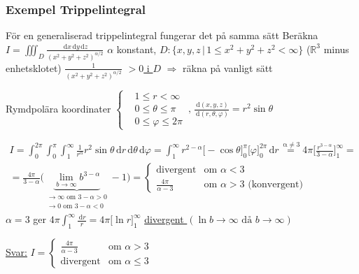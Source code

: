 \documentclass[a4paper]{article}
\newcommand{\svar}[1]{\underline{\underline{#1}}}
\newcommand{\de}[1]{\,\mathrm{d}#1}
\begin{document}
\subsubsection{Exempel Trippelintegral}
För en generaliserad trippelintegral fungerar det på samma sätt \newline
Beräkna $I=\iiint_D \frac{\de{x}\de{y}\de{z}}{(x^2+y^2+z^2)^{\alpha/2}}$ \newline
$\alpha$ konstant, $D: \{x,y,z \,|\, 1\leq x^2+y^2+z^2 <\infty\}$ ($\mathbb{R}^3$ minus enhetsklotet) \newline
$\frac{1}{(x^2+y^2+z^2)^{\alpha/2}}$ \underline{$> 0$ i $D$} $\Rightarrow$ räkna på vanligt sätt

Rymdpolära koordinater $
\begin{cases}
	& 1 \leq r < \infty \\
	& 0 \leq \theta \leq \pi \\
	& 0 \leq \varphi \leq 2\pi
\end{cases}
\,,\, \frac{\de{(x,y,z)}}{\de{(r,\theta,\varphi)}} = r^2\sin{\theta}$

\begin{gather*}
	I = \int_0^{2\pi}\int_0^\pi\int_1^\infty \frac{1}{r^\alpha}r^2\sin{\theta}\de{r}\de{\theta}\de{\varphi} =
	\int_1^\infty r^{2-\alpha} \Big[-\cos{\theta}\Big]_0^\pi\Big[\varphi\Big]_0^{2\pi} \de{r} \overset{\,\mathrm{\alpha\neq3}}{=}
	4\pi\Big[\frac{r^{3-\alpha}}{3-\alpha}\Big]_1^\infty = \\
	= \frac{4\pi}{3-\alpha} \Big(\underbrace{\lim_{b\rightarrow\infty}b^{3-\alpha}}_{\substack{\rightarrow\infty \text{ om } 3-\alpha > 0 \\\rightarrow 0 \text{ om } 3-\alpha < 0}}-1\Big)
	=
	\begin{cases}
		\text{divergent} & \text{om } \alpha < 3 \\
		\frac{4\pi}{\alpha -3} & \text{om } \alpha > 3 \text{ (konvergent)}
	\end{cases}
\end{gather*}
$\alpha = 3$ ger $4\pi\int_1^\infty \frac{\de{r}}{r} = 4\pi \Big[\ln{r}\Big]_1^\infty$ \underline{ divergent } $(\ln{b} \rightarrow \infty \text{ då } b\rightarrow\infty)$\newline

\svar{Svar:} $I=
\begin{cases}
	\frac{4\pi}{\alpha - 3} & \text{om } \alpha > 3 \\
	\text{divergent} & \text{om } \alpha \leq 3
\end{cases}$
\end{document}
